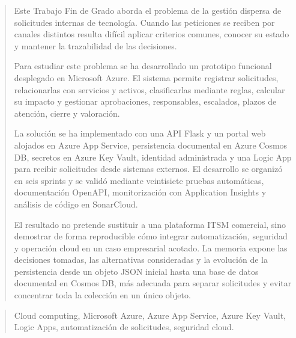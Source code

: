 \documentclass[a4paper,12pt,oneside]{memoir}
\begin{document}
\renewcommand*\abstractname{Resumen}
\begin{abstract}
Este Trabajo Fin de Grado aborda el problema de la gestión dispersa de solicitudes internas de tecnología. Cuando las peticiones se reciben por canales distintos resulta difícil aplicar criterios comunes, conocer su estado y mantener la trazabilidad de las decisiones.

Para estudiar este problema se ha desarrollado un prototipo funcional desplegado en Microsoft Azure. El sistema permite registrar solicitudes, relacionarlas con servicios y activos, clasificarlas mediante reglas, calcular su impacto y gestionar aprobaciones, responsables, escalados, plazos de atención, cierre y valoración.

La solución se ha implementado con una API Flask y un portal web alojados en Azure App Service, persistencia documental en Azure Cosmos DB, secretos en Azure Key Vault, identidad administrada y una Logic App para recibir solicitudes desde sistemas externos. El desarrollo se organizó en seis sprints y se validó mediante veintisiete pruebas automáticas, documentación OpenAPI, monitorización con Application Insights y análisis de código en SonarCloud.

El resultado no pretende sustituir a una plataforma ITSM comercial, sino demostrar de forma reproducible cómo integrar automatización, seguridad y operación cloud en un caso empresarial acotado. La memoria expone las decisiones tomadas, las alternativas consideradas y la evolución de la persistencia desde un objeto JSON inicial hasta una base de datos documental en Cosmos DB, más adecuada para separar solicitudes y evitar concentrar toda la colección en un único objeto.
\end{abstract}

\renewcommand*\abstractname{Descriptores}
\begin{abstract}
Cloud computing, Microsoft Azure, Azure App Service, Azure Key Vault, Logic Apps, automatización de solicitudes, seguridad cloud.
\end{abstract}

\clearpage
\end{document}
